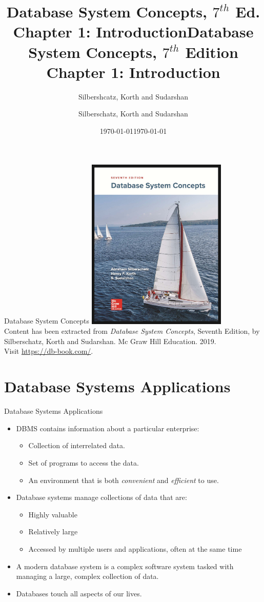 \documentclass{beamer}
\title{Database System Concepts, $7^{th}$ Ed. \\Chapter 1: Introduction}
\author{Silbershcatz, Korth and Sudarshan}
\date{\today}
\title[Chapter 1]{Database System Concepts, $7^{th}$ Edition \\ Chapter 1: Introduction}
\author{Silberschatz, Korth and Sudarshan}
\date{\today}
\begin{document}
\frame{\titlepage}

\begin{frame}{Database System Concepts}
    \centering
    \includegraphics[width=0.5\textwidth]{figures/book_cover.jpg} \\
    \vspace{5mm}
    {
        \tiny
        Content has been extracted from \textit{Database System Concepts}, Seventh Edition, by Silberschatz, Korth and Sudarshan. Mc Graw Hill Education. 2019.\\
        Visit \url{https://db-book.com/}.\\
    }
\end{frame}

\section{Database Systems Applications}

\begin{frame}{Database Systems Applications}
    \begin{itemize}
        \item DBMS contains information about a particular enterprise:
        \begin{itemize}
            \item Collection of interrelated data.
            \item Set of programs to access the data.
            \item An environment that is both \textit{convenient} and \textit{efficient} to use.
        \end{itemize}
        \item Database systems manage collections of data that are:
        \begin{itemize}
            \item Highly valuable
            \item Relatively large
            \item Accessed by multiple users and applications, often at the same time
        \end{itemize}
        \item A modern database system is a complex software system tasked with managing a large, complex collection of data.
        \item Databases touch all aspects of our lives.
    \end{itemize}
\end{frame}
\end{document}
